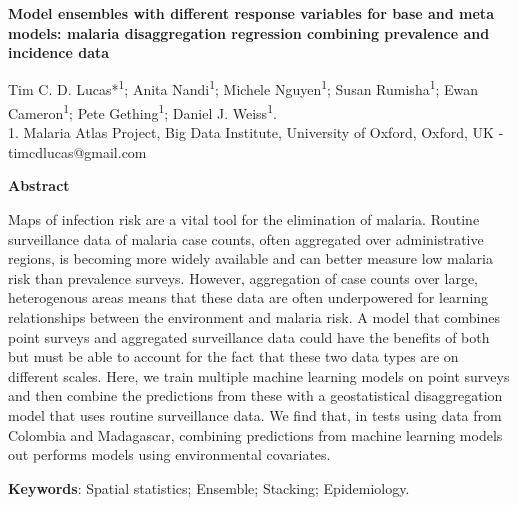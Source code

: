 \documentclass[11pt]{article}
\begin{document}
\templatefigures{}



\small{

\begin{center}
\textbf{Model ensembles with different response variables for base and meta models: malaria disaggregation regression combining prevalence and incidence data}
\end{center}



\begin{center}
{Tim C. D. Lucas*\textsuperscript{1}; Anita Nandi\textsuperscript{1}; Michele Nguyen\textsuperscript{1}; 
Susan Rumisha\textsuperscript{1}; Ewan Cameron\textsuperscript{1}; Pete Gething\textsuperscript{1}; Daniel J. Weiss\textsuperscript{1}.}\\
{1. Malaria Atlas Project, Big Data Institute, University of Oxford, Oxford, UK - timcdlucas@gmail.com}\\ 


\end{center}

\begin{center}
{\bf Abstract}
\end{center}

\setlength{\parindent}{0pt}


Maps of infection risk are a vital tool for the elimination of malaria.
Routine surveillance data of malaria case counts, often aggregated over administrative regions, is becoming more widely available and can better measure low malaria risk than prevalence surveys.
However, aggregation of case counts over large, heterogenous areas means that these data are often underpowered for learning relationships between the environment and malaria risk.
A model that combines point surveys and aggregated surveillance data could have the benefits of both but must be able to account for the fact that these two data types are on different scales.
Here, we train multiple machine learning models on point surveys and then combine the predictions from these with a geostatistical disaggregation model that uses routine surveillance data.
We find that, in tests using data from Colombia and Madagascar, combining predictions from machine learning models out performs models using environmental covariates.

{\bf Keywords}: Spatial statistics; Ensemble; Stacking; Epidemiology.
}\\
\end{document}
